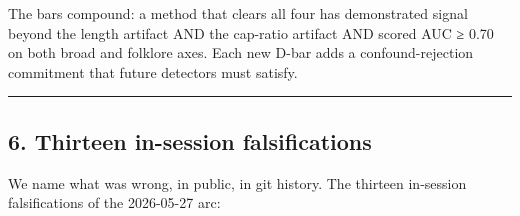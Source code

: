 \documentclass[
]{article}
\begin{document}
The bars compound: a method that clears all four has demonstrated signal
beyond the length artifact AND the cap-ratio artifact AND scored AUC ≥
0.70 on both broad and folklore axes. Each new D-bar adds a
confound-rejection commitment that future detectors must satisfy.

\begin{center}\rule{0.5\linewidth}{0.5pt}\end{center}

\subsection{6. Thirteen in-session
falsifications}\label{thirteen-in-session-falsifications}

We name what was wrong, in public, in git history. The thirteen
in-session falsifications of the 2026-05-27 arc:
\end{document}

